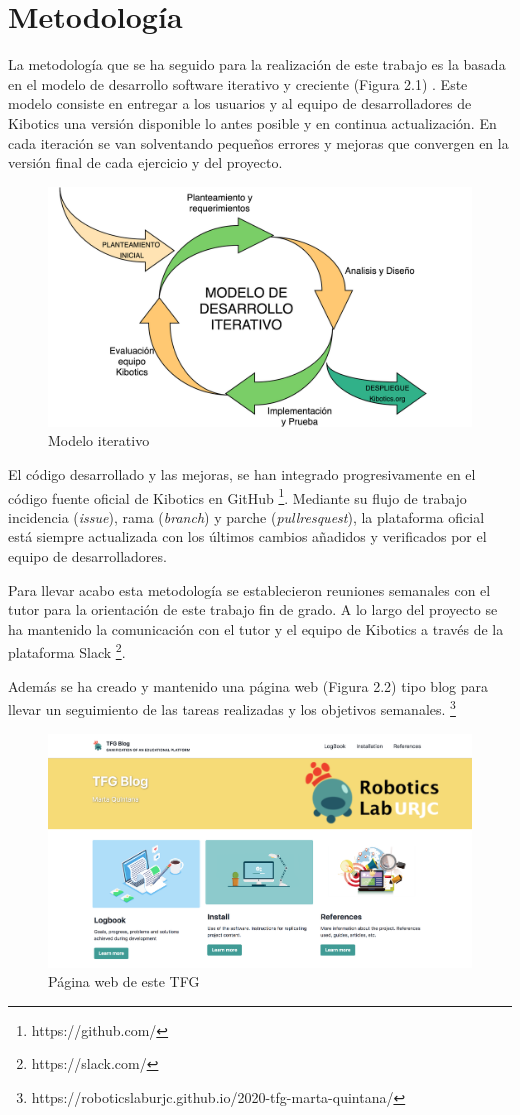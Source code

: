  
\section{Metodología}

La metodología que se ha seguido para la realización de este trabajo es la basada en el modelo de desarrollo software iterativo y creciente (Figura 2.1) \cite{modeloiter}.
Este modelo consiste en entregar a los usuarios y al equipo de desarrolladores de Kibotics una versión disponible lo antes posible y en continua actualización. En cada iteración se van solventando pequeños errores y mejoras que convergen en la versión final de cada ejercicio y del proyecto.

\begin{figure}[H]
    \centering
    \includegraphics[width=0.6\columnwidth]{chapters/images/metodologiaiterativa.png}
    \caption{Modelo iterativo}
    \label{fig:my_label}
\end{figure}


El código desarrollado y las mejoras, se han integrado progresivamente en el código fuente oficial de Kibotics en GitHub \footnote{https://github.com/}. Mediante su flujo de trabajo incidencia (\textit{issue}), rama (\textit{branch}) y parche (\textit{pullresquest}), la plataforma oficial está siempre actualizada con los últimos cambios añadidos y verificados por el equipo de desarrolladores.

Para llevar acabo esta metodología se establecieron reuniones semanales con el tutor para la orientación de este trabajo fin de grado. A lo largo del proyecto se ha mantenido la comunicación con el tutor y el equipo de Kibotics a través de la plataforma Slack \footnote{https://slack.com/}. 



Además se ha creado y mantenido una página web (Figura 2.2) tipo blog para llevar un seguimiento de las tareas realizadas y los objetivos semanales. \footnote{https://roboticslaburjc.github.io/2020-tfg-marta-quintana/}

\begin{figure}[H]
    \centering
    \includegraphics[width=0.6\linewidth]{chapters/images/webtfg.png}
    \caption{Página web de este TFG}
    \label{fig:my_label}
\end{figure}


